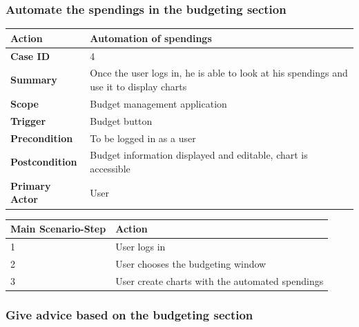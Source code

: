 \documentclass[letterpaper]{article}
\begin{document}
		\subsubsection{Automate the spendings in the budgeting section}
		
		\begin{center}
				\begin{tabular}{ | m{3.5cm} | m{7.5cm}| } 
				\hline
				\textbf{Action} & Automation of spendings \\ 
				\hline
				\textbf{Case ID} & 4 \\ 
				\hline
				\textbf{Summary} & Once the user logs in, he is able to look at his spendings and use it to display charts \\
				\hline
				\textbf{Scope} & Budget management application \\ 
				\hline
				\textbf{Trigger} & Budget button \\
				\hline
				\textbf{Precondition} & To be logged in as a user \\ 
				\hline
				\textbf{Postcondition} & Budget information displayed and editable, chart is accessible \\ 
				\hline
				\textbf{Primary Actor} & User \\ 
				\hline
				\end{tabular}
		
			\vspace{2mm}
		
			\begin{tabular}{ | m{3.5cm} | m{7.5cm}| } 
				\hline
				\textbf{Main Scenario-Step} & \textbf{Action} \\ 
				\hline
				1 & User logs in \\ 
				\hline
				2 & User chooses the budgeting window \\ 
				\hline
				3 & User create charts with the automated spendings \\ 
				\hline
				\end{tabular}
		\end{center}

			
		\subsubsection{Give advice based on the budgeting section}
		
\end{document}
